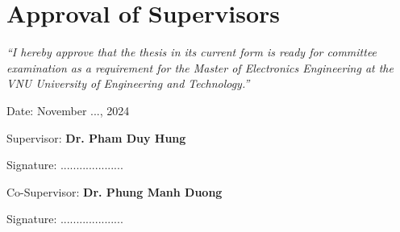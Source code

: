 \chapter*{Approval of Supervisors}

\textit{``I hereby approve that the thesis in its current form is ready for committee examination as a requirement for the Master of Electronics Engineering at the VNU University of Engineering and Technology.''}
\vspace{1cm}

\begin{flushleft}
    Date: November ..., 2024\quad\par

    Supervisor: \textbf{Dr. Pham Duy Hung}
    
    \vspace{0.5cm}
    Signature: ....................

    Co-Supervisor: \textbf{Dr. Phung Manh Duong}

    \vspace{0.5cm}
    Signature: ....................
\end{flushleft}